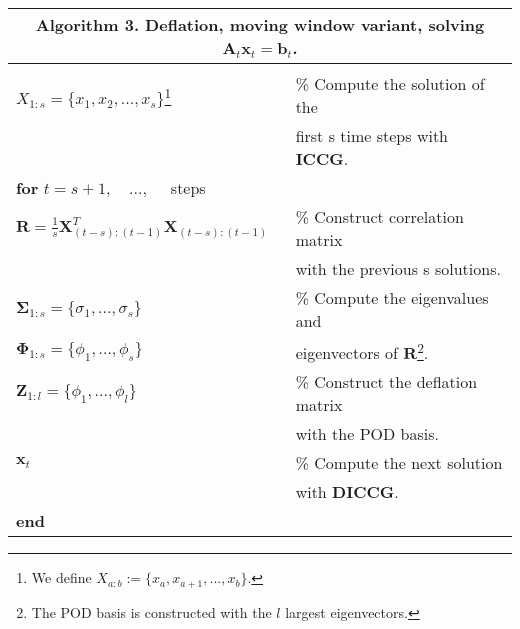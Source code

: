 \documentclass[12pt]{article}
\begin{document}
 \begin{minipage}{12cm}
\begin{tabular}{ |l l| } 
\hline
\multicolumn{2}{|c|}{\textbf{Algorithm 3.} Deflation, moving window variant, solving $\mathbf{A}_t\mathbf{x}_t=\mathbf{b}_t$.}\\
\hline
 \hline
&\\
\hspace{0.5cm}$X_{1:s}=\{x_1,x_2,...,x_{s}\}$\footnote{We define $X_{a:b}:=\{x_a,x_{a+1},...,x_{b}\}$.}  &\footnotesize\% Compute the solution of the \\ &\hspace{0.5cm}\footnotesize first s time steps with \textbf{ICCG}. \\
\hspace{0.5cm}\textbf{for} $t=s+1,\quad ...,\quad$ steps&\\
 \hspace{1cm}$\mathbf{R}= \frac{1}{s}\mathbf{X}_{(t-s):(t-1)}^T\mathbf{X}_{(t-s):(t-1)}$&\footnotesize \% Construct correlation matrix \\&\hspace{0.5cm}\footnotesize with the previous s solutions. \\
  \hspace{1cm}$\mathbf{\Sigma}_{1:s}= \{\sigma_{1}, ... ,\sigma_{s}\}$& \footnotesize \% Compute the eigenvalues  and \\
  \hspace{1cm}$\mathbf{\Phi}_{1:s}= \{\phi_{1}, ... ,\phi_{s}\}$ &\hspace{0.5cm}\footnotesize eigenvectors of $\mathbf{R}$\footnote{The POD basis is constructed with the $l$ largest eigenvectors.}. \\
 
  \hspace{1cm}$\mathbf{Z}_{1:l}=\{\phi_{1}, ... ,\phi_{l}\}$& \footnotesize \% Construct the deflation matrix  \\
   &\hspace{0.5cm}\footnotesize with the POD basis. \\ 
  \hspace{1cm}$\mathbf{x}_t$& \footnotesize \% Compute the next solution \\
  & \hspace{0.5cm}\footnotesize with \textbf{DICCG}. \\ 
  
\hspace{0.5cm}\textbf{end}&\\
\hline
\end{tabular}
\end{minipage}\par \vspace{0.5cm}
\end{document}
